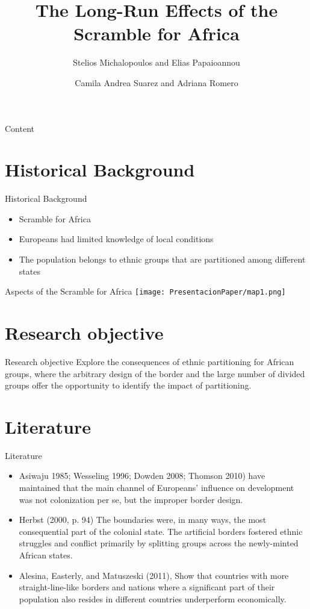\documentclass[11pt]{beamer}
\author[Camila and Adriana]{Camila Andrea Suarez and Adriana Romero}
\title[Presentation paper]{The Long-Run Effects of the Scramble for Africa}
\subtitle{Stelios Michalopoulos and Elias Papaioannou}
\institute[]{
	\inst{}
		Pontificia Universidad Javeriana\\
			\vspace{2mm}
	\inst{}
		Economic Growth and Comparative Development
}
\begin{document}
\begin{frame}
\maketitle
\end{frame}

\begin{frame}{Content}
\tableofcontents
\end{frame}
	
\section{Historical Background}
\begin{frame}{Historical Background}
\begin{itemize}
\item Scramble for Africa 
\pause
\item Europeans had limited knowledge of local conditions
\pause
\item The population belongs to ethnic groups that are partitioned among different states
\end{itemize}
\end{frame}

\begin{frame}{Aspects of the Scramble for Africa}
\texttt{[image: PresentacionPaper/map1.png]}  
\centering
\end{frame}	

\section{Research objective}
\begin{frame}{Research objective}
\justifying Explore the consequences of ethnic partitioning for African groups, where the arbitrary design of the border and the large number of divided groups offer the opportunity to identify the impact of partitioning.
\end{frame}

\section{Literature}
\begin{frame}{Literature}
\justifying 
\begin{itemize}
\item Asiwaju 1985; Wesseling 1996; Dowden 2008; Thomson 2010) have maintained that the main channel of Europeans’ influence on development was not colonization per se, but the improper border design. 
\pause
\item Herbst (2000, p. 94) The boundaries were, in many ways, the most consequential part of the colonial state. The artificial
borders fostered ethnic struggles and conflict primarily by splitting groups across the newly-minted African states.
\pause
\item Alesina, Easterly, and Matuszeski (2011), Show that countries with more straight-line-like borders and nations where a significant part of their population also resides in different countries underperform economically.
\end{itemize}
\end{frame}
\end{document}
